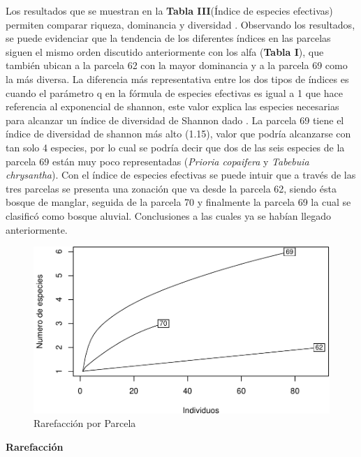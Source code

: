 \documentclass[conference,final,12pt,]{IEEEtran}
\makeatletter
\def\maxwidth{\ifdim\Gin@nat@width>\linewidth\linewidth
\else\Gin@nat@width\fi}
\let\Oldincludegraphics\includegraphics
\renewcommand{\includegraphics}[1]{\Oldincludegraphics[width=\maxwidth]{#1}}
\makeatother
\begin{document}
Los resultados que se muestran en la \textbf{Tabla III}(Índice de
especies efectivas) permiten comparar riqueza, dominancia y diversidad
\citep{V}. Observando los resultados, se puede evidenciar que la
tendencia de los diferentes índices en las parcelas siguen el mismo
orden discutido anteriormente con los alfa (\textbf{Tabla I}), que
también ubican a la parcela 62 con la mayor dominancia y a la parcela 69
como la más diversa. La diferencia más representativa entre los dos
tipos de índices es cuando el parámetro q en la fórmula de especies
efectivas es igual a 1 que hace referencia al exponencial de shannon,
este valor explica las especies necesarias para alcanzar un índice de
diversidad de Shannon dado \citep{B}. La parcela 69 tiene el índice
de diversidad de shannon más alto (1.15), valor que podría alcanzarse con
tan solo 4 especies, por lo cual se podría decir que dos de las seis
especies de la parcela 69 están muy poco representadas (\emph{Prioria
copaifera} y \emph{Tabebuia chrysantha}). Con el índice de especies
efectivas se puede intuir que a través de las tres parcelas se presenta
una zonación que va desde la parcela 62, siendo ésta bosque de manglar,
seguida de la parcela 70 y finalmente la parcela 69 la cual se clasificó
como bosque aluvial. Conclusiones a las cuales ya se habían llegado
anteriormente.

\begin{figure}[htb]
\centering
\includegraphics{mangrove_files/figure-latex/unnamed-chunk-5-1.pdf}
\caption{Rarefacción por Parcela}
\end{figure}

\textbf{Rarefacción} 
\end{document}
